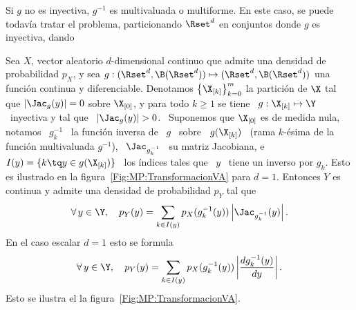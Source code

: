 Si $g$ no es inyectiva, $g^{-1}$  es multivaluada o multiforme. En este caso, se
puede todav\'ia  tratar el problema, particionando $\Rset^d$  en conjuntos donde
$g$ es inyectiva, dando
%
\begin{teorema}\label{Teo:MP:TransformacionNoInyectivaDensidad}
%
  Sea $X$, vector aleatorio $d$-dimensional  continuo que admite una densidad de
  probabilidad  $p_X$,  y sea  $g:(\Rset^d  ,  \B(\Rset^d))  \mapsto (\Rset^d  ,
  \B(\Rset^d))$  una  funci\'on continua  y  diferenciable.  Denotamos  $\left\{
    \X_{[k]} \right\}_{k=0}^m$ la partici\'on  de $\X$ tal que $\left| \Jac_g(y)
  \right| = 0$ sobre  $\X_{[0]}$, y para todo $k \ge 1$  se tiene \ $g: \X_{[k]}
  \mapsto  \Y$ \  inyectiva  y tal  que \  $\left|  \Jac_g(y) \right|  > 0$.   \
  Suponemos que $\X_{[0]}$ es de medida  nula, notamos \ $g_k^{-1}$
  \ la funci\'on inversa de \ $g$ \ sobre \ $g(\X_{[k]})$ \ (rama $k$-\'esima de
  la  funci\'on   multivaluada  $g^{-1}$),  \  $\Jac_{g_k^{-1}}$   \  su  matriz
  Jacobiana, e \  $I(y) = \{ k \tq  y \in g(\X_{[k]}) \}$ \  los \'indices tales
  que  \  $y$  \  tiene  un   inverso  por  $g_k$.   Esto  es  ilustrado  en  la
  figura~\ref{Fig:MP:TransformacionVA} para $d = 1$.  Entonces $Y$ es continua y
  admite una densidad de probabilidad $p_Y$ tal que
  \[
  \forall  \, y  \in \Y,  \quad p_Y(y)  = \sum_{k  \in  I(y)} p_X(g_k^{-1}(y))
  \left| \Jac_{g_k^{-1}}(y) \right|.
  \]
  En el caso escalar $d = 1$ esto se formula
  \[
  \forall \, y \in \Y, \quad  p_Y(y) = \sum_{k \in I(y)} p_X(g_k^{-1}(y)) \left|
    \frac{d g_k^{-1}(y)}{dy} \right|.
  \]
  \noindent Esto se ilustra el la figura~\ref{Fig:MP:TransformacionVA}.
\end{teorema}
%
